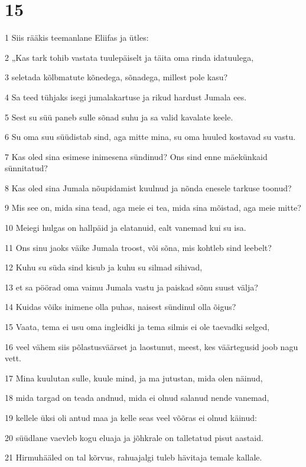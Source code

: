 \chapter{15}

\par 1 Siis rääkis teemanlane Eliifas ja ütles:
\par 2 „Kas tark tohib vastata tuulepäiselt ja täita oma rinda idatuulega,
\par 3 seletada kõlbmatute kõnedega, sõnadega, millest pole kasu?
\par 4 Sa teed tühjaks isegi jumalakartuse ja rikud hardust Jumala ees.
\par 5 Sest su süü paneb sulle sõnad suhu ja sa valid kavalate keele.
\par 6 Su oma suu süüdistab sind, aga mitte mina, su oma huuled kostavad su vastu.
\par 7 Kas oled sina esimese inimesena sündinud? Ons sind enne mäekünkaid sünnitatud?
\par 8 Kas oled sina Jumala nõupidamist kuulnud ja nõnda enesele tarkuse toonud?
\par 9 Mis see on, mida sina tead, aga meie ei tea, mida sina mõistad, aga meie mitte?
\par 10 Meiegi hulgas on hallpäid ja elatanuid, ealt vanemad kui su isa.
\par 11 Ons sinu jaoks väike Jumala troost, või sõna, mis kohtleb sind leebelt?
\par 12 Kuhu su süda sind kisub ja kuhu su silmad sihivad,
\par 13 et sa pöörad oma vaimu Jumala vastu ja paiskad sõnu suust välja?
\par 14 Kuidas võiks inimene olla puhas, naisest sündinul olla õigus?
\par 15 Vaata, tema ei usu oma ingleidki ja tema silmis ei ole taevadki selged,
\par 16 veel vähem siis põlastusväärset ja laostunut, meest, kes väärtegusid joob nagu vett.
\par 17 Mina kuulutan sulle, kuule mind, ja ma jutustan, mida olen näinud,
\par 18 mida targad on teada andnud, mida ei olnud salanud nende vanemad,
\par 19 kellele üksi oli antud maa ja kelle seas veel võõras ei olnud käinud:
\par 20 süüdlane vaevleb kogu eluaja ja jõhkrale on talletatud pisut aastaid.
\par 21 Hirmuhääled on tal kõrvus, rahuajalgi tuleb hävitaja temale kallale.

